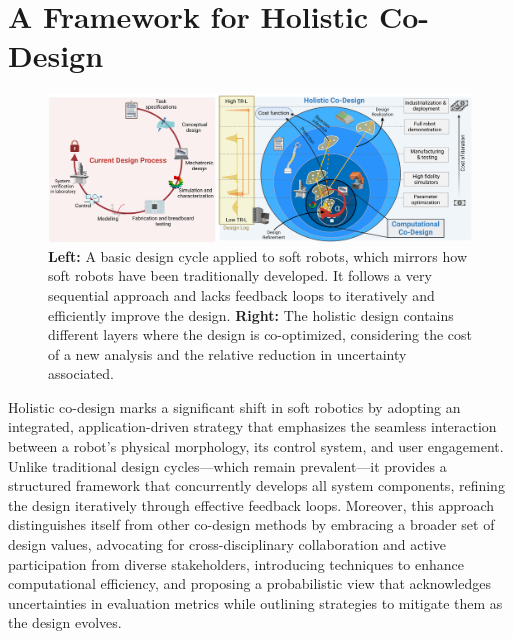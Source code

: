 \section{A Framework for Holistic Co-Design}\label{sec:apx:holisticcodesign:holistic_co_design_framework}
\begin{figure}[h!]
    \centering
    \includegraphics[width=1\linewidth]{appendix-holistic-codesign/figures/current_design_vs_holistic_codesign_v1.pdf}
    \caption{
        \textbf{Left:} A basic design cycle applied to soft robots, which mirrors how soft robots have been traditionally developed. It follows a very sequential approach and lacks feedback loops to iteratively and efficiently improve the design.
        \textbf{Right:} The holistic design contains different layers where the design is co-optimized, considering the cost of a new analysis and the relative reduction in uncertainty associated.
    }
    \label{fig:apx:holisticcodesign:current_design_vs_holistic_codesign}
\end{figure}

Holistic co-design marks a significant shift in soft robotics by adopting an integrated, application-driven strategy that emphasizes the seamless interaction between a robot’s physical morphology, its control system, and user engagement. Unlike traditional design cycles—which remain prevalent—it provides a structured framework that concurrently develops all system components, refining the design iteratively through effective feedback loops. Moreover, this approach distinguishes itself from other co-design methods by embracing a broader set of design values, advocating for cross-disciplinary collaboration and active participation from diverse stakeholders, introducing techniques to enhance computational efficiency, and proposing a probabilistic view that acknowledges uncertainties in evaluation metrics while outlining strategies to mitigate them as the design evolves.

